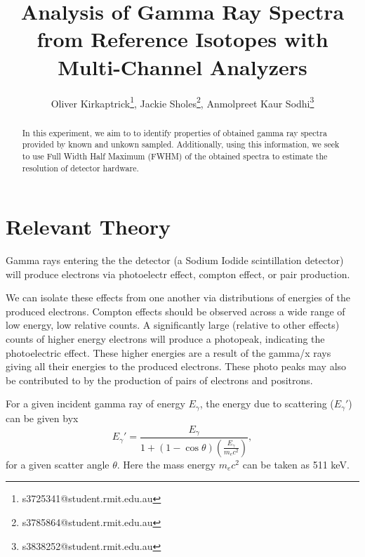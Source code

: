 \documentclass[a4paper]{article}
\title{Analysis of Gamma Ray Spectra from Reference Isotopes with Multi-Channel Analyzers}
\author{
    Oliver Kirkaptrick\footnote{s3725341@student.rmit.edu.au},
    Jackie Sholes\footnote{s3785864@student.rmit.edu.au},
    Anmolpreet Kaur Sodhi\footnote{s3838252@student.rmit.edu.au}
}
\begin{document}
\maketitle

\begin{abstract}
    In this experiment, we aim to to identify properties of obtained gamma ray spectra provided by known and unkown sampled. Additionally, using this information, we seek to use Full Width Half Maximum (FWHM) of the obtained spectra to estimate the resolution of detector hardware.
\end{abstract}

\section{Relevant Theory}

Gamma rays entering the the detector (a Sodium Iodide scintillation detector) will produce electrons via photoelectr effect, compton effect, or pair production.

We can isolate these effects from one another via distributions of energies of the produced electrons. Compton effects should be observed across a wide range of low energy, low relative counts. A significantly large (relative to other effects) counts of higher energy electrons will produce a photopeak, indicating the photoelectric effect. These higher energies are a result of the gamma/x rays giving all their energies to the produced electrons. These photo peaks may also be contributed to by the production of pairs of electrons and positrons.

For a given incident gamma ray of energy $E_{\gamma}$, the energy due to scattering ($E_{\gamma}'$) can be given byx
\begin{equation}
    E_{\gamma}'=\frac{E_{\gamma}}{1+\left(1-\cos\theta\right)\left(\frac{E_{\gamma}}{m_{e}c^{2}}\right)},
\end{equation}
for a given scatter angle $\theta$. Here the mass energy $m_{e}c^{2}$ can be taken as 511 keV.
\end{document}
